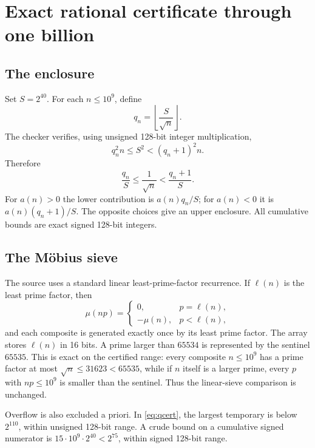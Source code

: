\section{Exact rational certificate through one billion}

\subsection{The enclosure}
Set $S=2^{40}$.  For each $n\le10^9$, define
\[
 q_n=\left\lfloor\frac{S}{\sqrt n}\right\rfloor.
\]
The checker verifies, using unsigned 128-bit integer multiplication,
\begin{equation}\label{eq:qcert}
 q_n^2n\le S^2<(q_n+1)^2n.
\end{equation}
Therefore
\[
 \frac{q_n}{S}\le\frac1{\sqrt n}<\frac{q_n+1}{S}.
\]
For $a(n)>0$ the lower contribution is $a(n)q_n/S$; for $a(n)<0$ it is
$a(n)(q_n+1)/S$.  The opposite choices give an upper enclosure.  All cumulative
bounds are exact signed 128-bit integers.

\subsection{The Möbius sieve}
The source uses a standard linear least-prime-factor recurrence.  If
$\ell(n)$ is the least prime factor, then
\[
 \mu(np)=\begin{cases}0,&p=\ell(n),\\-\mu(n),&p<\ell(n),\end{cases}
\]
and each composite is generated exactly once by its least prime factor.  The
array stores $\ell(n)$ in 16 bits.  A prime larger than $65534$ is represented
by the sentinel $65535$.  This is exact on the certified range: every composite
$n\le10^9$ has a prime factor at most
$\sqrt n\le31623<65535$, while if $n$ itself is a larger prime, every
$p$ with $np\le10^9$ is smaller than the sentinel.  Thus the linear-sieve
comparison is unchanged.

Overflow is also excluded a priori.  In \eqref{eq:qcert}, the largest temporary
is below $2^{110}$, within unsigned 128-bit range.  A crude bound on a cumulative
signed numerator is $15\cdot10^9\cdot2^{40}<2^{75}$, within signed 128-bit
range.

